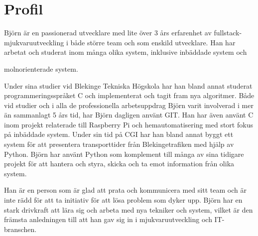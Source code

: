 \documentclass{article}
\begin{document}
\noindent
\begin{minipage}[t]{0.7\textwidth}
\vspace{-20pt} %
\section*{\textcolor{colorBlue}{Profil}}
Björn är en passionerad utvecklare med lite över 3 års erfarenhet av fullstack-mjukvaruutveckling 
i både större team och som enskild utvecklare. Han har arbetat och studerat inom många olika system, 
inklusive inbäddade system och 

molnorienterade system.

\vspace{10pt}
Under sina studier vid Blekinge Tekniska Högskola har han bland annat studerat programmeringsspråket C 
och implementerat och tagit fram nya algoritmer. Både vid studier och i alla de professionella arbetsuppdrag 
Björn varit involverad i mer än sammanlagt 5 års tid, har Björn dagligen använt GIT. Han har även använt C 
inom projekt relaterade till Raspberry Pi och hemautomatisering med stort fokus på inbäddade system. 
Under sin tid på CGI har han bland annat byggt ett system för att presentera transporttider från 
Blekingetrafiken med hjälp av Python. Björn har använt Python som komplement till många av sina 
tidigare projekt för att hantera och styra, skicka och ta emot information från olika system.

\vspace{10pt}
Han är en person som är glad att prata och kommunicera med sitt team och är inte rädd för att ta 
initiativ för att lösa problem som dyker upp. Björn har en stark drivkraft att lära sig och arbeta 
med nya tekniker och system, vilket är den främsta anledningen till att han gav sig in i 
mjukvaruutveckling och IT-branschen.

\end{minipage}%
\hfill
\end{document}

